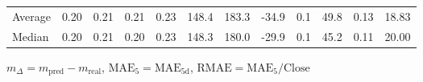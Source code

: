 \begin{threeparttable}
{\begin{tabular}{lrrrrrrrrrrr}
Average &          0.20 &          0.21 &          0.21 &        0.23 &               148.4 &               183.3 &      -34.9 &                 0.1 &             49.8 &            0.13 &                  18.83 \\
 Median &          0.20 &          0.21 &          0.20 &        0.23 &               148.3 &               180.0 &      -29.9 &                 0.1 &             45.2 &            0.11 &                  20.00 \\
\bottomrule
\end{tabular}
}
\begin{tablenotes}\footnotesize
\item $m_\Delta=m_{\text{pred}}-m_{\text{real}}$,
$\mathrm{MAE}_5=\mathrm{MAE}_{5\text{d}}$,
$\mathrm{RMAE}=\mathrm{MAE}_5/\text{Close}$
\end{tablenotes}
\end{threeparttable}
\endgroup

